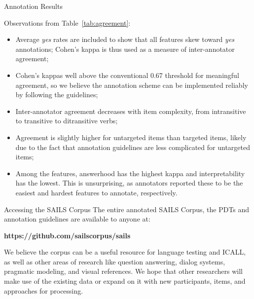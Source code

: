 \documentclass[final,t]{beamer}
\begin{document}
\begin{frame}{}
\begin{columns}[t]
\begin{column}{.33\linewidth}
\begin{block}{Annotation Results}
\begin{center}
\begin{minipage}{.85\textwidth}
Observations from Table~\ref{tab:agreement}:
\begin{itemize}
	\vspace{.5em}
	\item Average \textit{yes} rates are included to show that all features skew toward \textit{yes} annotations; Cohen's kappa is thus used as a measure of inter-annotator agreement;
	\vspace{.5em}
	\item Cohen's kappas well above the conventional 0.67 threshold for meaningful agreement, so we believe the annotation scheme can be implemented reliably by following the guidelines;
	\vspace{.5em}
	\item Inter-annotator agreement decreases with item complexity, from intransitive to transitive to ditransitive verbs;
	\vspace{.5em}
	\item Agreement is slightly higher for untargeted items than targeted items, likely due to the fact that annotation guidelines are less complicated for untargeted items;
	\vspace{.5em}
	\item Among the features, answerhood has the highest kappa and interpretability has the lowest. This is unsurprising, as annotators reported these to be the easiest and hardest features to annotate, respectively.
\end{itemize}

\end{minipage}
\end{center}
\end{block}

\begin{block}{Accessing the SAILS Corpus}
The entire annotated SAILS Corpus, the PDTs and annotation guidelines are available to anyone at:

\vspace{.5em}
\textbf{https://github.com/sailscorpus/sails}

\vspace{.5em}
We believe the corpus can be a useful resource for language testing and ICALL, as well as other areas of research like question answering, dialog systems, pragmatic modeling, and visual references. We hope that other researchers will make use of the existing data or expand on it with new participants, items, and approaches for processing.

\end{block}

\end{column}

\end{columns}
\end{frame}
\end{document}
